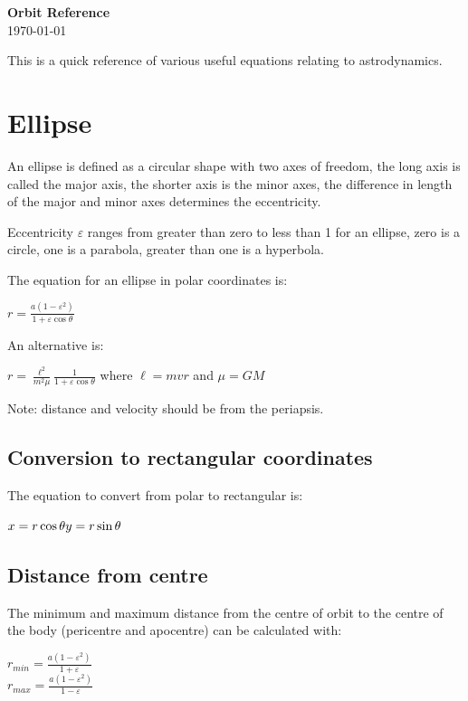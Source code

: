 \documentclass{article}
\begin{document}
\begin{center}
	\fontsize{22pt}{1.2}\textbf{\vspace{10px} Orbit Reference}\\
	\large\today\vspace{30px}
\end{center}


This is a quick reference of various useful equations relating to astrodynamics.

\section{Ellipse}

An ellipse is defined as a circular shape with two axes of freedom, the long axis is called the major axis, the shorter axis is the minor axes, the difference in length of the major and minor axes determines the eccentricity.

Eccentricity $\varepsilon$ ranges from greater than zero to less than 1 for an ellipse, zero is a circle, one is a parabola, greater than one is a hyperbola.

The equation for an ellipse in polar coordinates is:

$r = \frac{a(1-\varepsilon^2)}{1+\varepsilon \cos \theta}$

An alternative is:

$r = \frac{\ell^2}{m^2\mu} \frac{1}{1+\varepsilon \cos\theta}$ where $\ell = mvr$ and $\mu = GM $

Note: distance and velocity should be from the periapsis.

\subsection{Conversion to rectangular coordinates}

The equation to convert from polar to rectangular is:

$ x = r \cos \theta\\y = r \sin \theta $

\subsection{Distance from centre}

The minimum and maximum distance from the centre of orbit to the centre of the body (pericentre and apocentre) can be calculated with:

$ r_{min} = \frac{a(1-\varepsilon^2)}{1+\varepsilon} $\\[5px]
$ r_{max} = \frac{a(1-\varepsilon^2)}{1-\varepsilon} $
\end{document}
